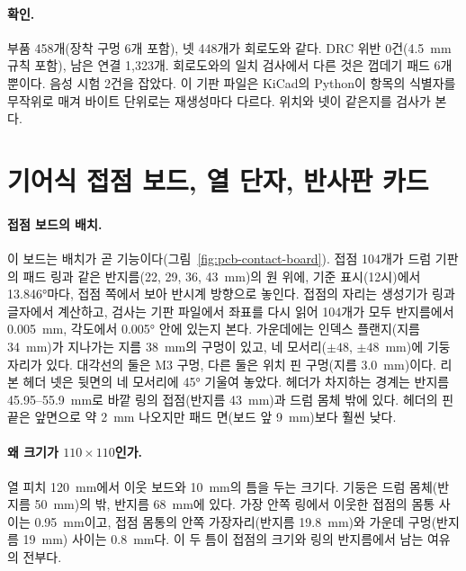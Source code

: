 \paragraph{확인.} 부품 458개(장착 구멍 6개 포함), 넷 448개가 회로도와 같다. DRC 위반 0건(4.5~mm 규칙 포함), 남은
연결 1,323개. 회로도와의 일치 검사에서 다른 것은 껍데기 패드 6개뿐이다. 음성 시험 2건을 잡았다. 이 기판 파일은
KiCad의 Python이 항목의 식별자를 무작위로 매겨 바이트 단위로는 재생성마다 다르다. 위치와 넷이 같은지를 검사가 본다.


\section{기어식 접점 보드, 열 단자, 반사판 카드}\label{pcb:contact-board}

\paragraph{접점 보드의 배치.} 이 보드는 배치가 곧 기능이다(그림~\ref{fig:pcb-contact-board}). 접점 104개가 드럼
기판의 패드 링과 같은 반지름(22, 29, 36, 43~mm)의 원 위에, 기준 표시(12시)에서 13.846°마다, 접점 쪽에서 보아 반시계
방향으로 놓인다. 접점의 자리는 생성기가 링과 글자에서 계산하고, 검사는 기판 파일에서 좌표를 다시 읽어 104개가
모두 반지름에서 0.005~mm, 각도에서 0.005° 안에 있는지 본다. 가운데에는 인덱스 플랜지(지름 34~mm)가 지나가는 지름
38~mm의 구멍이 있고, 네 모서리($\pm 48$, $\pm 48$~mm)에 기둥 자리가 있다. 대각선의 둘은 M3 구멍, 다른 둘은 위치 핀
구멍(지름 3.0~mm)이다. 리본 헤더 넷은 뒷면의 네 모서리에 45° 기울여 놓았다. 헤더가 차지하는 경계는 반지름
45.95--55.9~mm로 바깥 링의 접점(반지름 43~mm)과 드럼 몸체 밖에 있다. 헤더의 핀 끝은 앞면으로 약 2~mm 나오지만 패드
면(보드 앞 9~mm)보다 훨씬 낮다.

\paragraph{왜 크기가 $110 \times 110$인가.} 열 피치 120~mm에서 이웃 보드와 10~mm의 틈을 두는 크기다. 기둥은 드럼
몸체(반지름 50~mm)의 밖, 반지름 68~mm에 있다. 가장 안쪽 링에서 이웃한 접점의 몸통 사이는 0.95~mm이고, 접점 몸통의
안쪽 가장자리(반지름 19.8~mm)와 가운데 구멍(반지름 19~mm) 사이는 0.8~mm다. 이 두 틈이 접점의 크기와 링의 반지름에서
남는 여유의 전부다.

